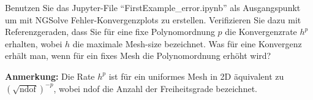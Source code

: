 
\begin{exercise}
Benutzen Sie das Jupyter-File ``FirstExample\_error.ipynb''
als Ausgangspunkt um mit NGSolve
Fehler-Konvergenzplots zu erstellen. Verifizieren Sie dazu mit Referenzgeraden, dass Sie für eine fixe
Polynomordnung $p$ die Konvergenzrate $h^p$ erhalten, wobei $h$ die maximale Mesh-size bezeichnet.
Was für eine Konvergenz erhält man, wenn für ein fixes Mesh die Polynomordnung erhöht wird?

\textbf{Anmerkung:} Die Rate $h^p$ ist für ein uniformes Mesh in 2D äquivalent zu $(\sqrt{\text{ndof}})^{-p}$, wobei ndof die Anzahl der Freiheitsgrade bezeichnet.
\end{exercise}


\begin{solution}

\end{solution}

